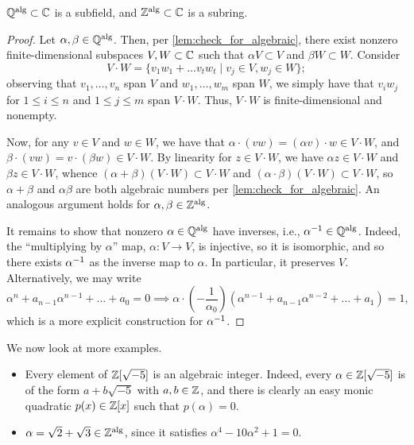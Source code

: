\begin{proposition} \label{prop:algebraics_form_subfield_subring}
    $\mathbb Q^{\operatorname{alg}} \subset \mathbb C$ is a subfield, and $\mathbb Z^{\operatorname{alg}} \subset \mathbb C$ is a subring.
\end{proposition}
\begin{proof}
    Let $\alpha, \beta \in \mathbb Q^{\operatorname{alg}}$. Then, per \ref{lem:check_for_algebraic}, there exist nonzero finite-dimensional subspaces $V, W \subset \mathbb C$ such that $\alpha V \subset V$ and $\beta W \subset W$. Consider
    \[ V \cdot W = \{v_1w_1 + \dots v_tw_t \mid v_j \in V, w_j \in W\}; \]
    observing that $v_1, \dots, v_n$ span $V$ and $w_1, \dots, w_m$ span $W$, we simply have that $v_i w_j$ for $1 \leq i \leq n$ and $1 \leq j \leq m$ span $V \cdot W$. Thus, $V \cdot W$ is finite-dimensional and nonempty.

    Now, for any $v \in V$ and $w \in W$, we have that $\alpha \cdot (vw) = (\alpha v) \cdot w \in V \cdot W$, and $\beta \cdot (vw) = v \cdot (\beta w) \in V \cdot W$. By linearity for $z \in V \cdot W$, we have $\alpha z \in V \cdot W$ and $\beta z \in V \cdot W$, whence $(\alpha + \beta) (V \cdot W) \subset V \cdot W$ and $(\alpha \cdot \beta) (V \cdot W) \subset V \cdot W$, so $\alpha + \beta$ and $\alpha \beta$ are both algebraic numbers per \ref{lem:check_for_algebraic}. An analogous argument holds for $\alpha, \beta \in \mathbb Z^{\operatorname{alg}}$.

    It remains to show that nonzero $\alpha \in \mathbb Q^{\operatorname{alg}}$ have inverses, i.e., $\alpha^{-1} \in \mathbb Q^{\operatorname{alg}}$. Indeed, the ``multiplying by $\alpha$'' map, $\alpha \colon V \to V$, is injective, so it is isomorphic, and so there exists $\alpha^{-1}$ as the inverse map to $\alpha$. In particular, it preserves $V$. Alternatively, we may write
    \[ \alpha^n + a_{n-1} \alpha^{n-1} + \dots + a_0 = 0 \implies \alpha \cdot \left(-\frac{1}{\alpha_0}\right) (\alpha^{n-1} + a_{n-1} \alpha^{n-2} + \dots + a_1) = 1, \]
    which is a more explicit construction for $\alpha^{-1}$.
\end{proof}

\newpage
We now look at more examples.
\begin{itemize}
    \item Every element of $\mathbb Z[\sqrt{-5}]$ is an algebraic integer. Indeed, every $\alpha \in \mathbb Z[\sqrt{-5}]$ is of the form $a + b \sqrt{-5}$ with $a, b \in \mathbb Z$, and there is clearly an easy monic quadratic $p(x) \in \mathbb Z[x]$ such that $p(\alpha) = 0$.
    \item $\alpha = \sqrt{2} + \sqrt{3} \in \mathbb Z^{\operatorname{alg}}$, since it satisfies $\alpha^4 - 10 \alpha^2 + 1 = 0$.
\end{itemize}

